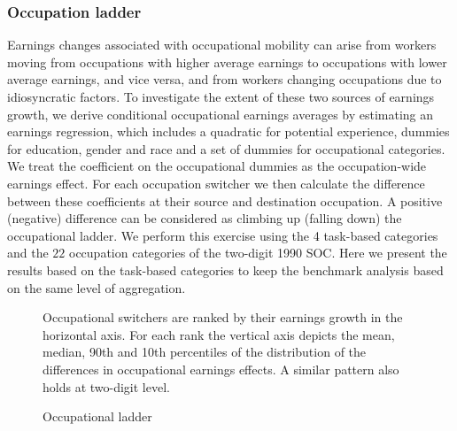 \documentclass[12pt]{article}
\theoremstyle{definition}
\begin{document}
\subsubsection{Occupation ladder}

Earnings changes associated with occupational mobility can arise from workers moving from occupations with higher average earnings to occupations with lower average earnings, and vice versa, and from workers changing occupations due to idiosyncratic factors. To investigate the extent of these two sources of earnings growth, we derive conditional occupational earnings averages by estimating an earnings regression, which includes a quadratic for potential experience, dummies for education, gender and race and a set of dummies for occupational categories. We treat the coefficient on the occupational dummies as the occupation-wide earnings effect. For each occupation switcher we then calculate the difference between these coefficients at their source and destination occupation. A positive (negative) difference can be considered as climbing up (falling down) the occupational ladder. We perform this exercise using the 4 task-based categories and the $22$ occupation categories of the two-digit 1990 SOC. Here we present the results based on the task-based categories to keep the benchmark analysis based on the same level of aggregation. 

\begin{figure}[H]
    \noindent\caption{Occupational ladder}
    \begin{center}
    \end{center}
    \vspace{-20pt}
    {\footnotesize Occupational switchers are ranked by their earnings growth in the horizontal axis. For each rank the vertical axis depicts the mean, median, 90th and 10th percentiles of the distribution of the differences in occupational earnings effects. A similar pattern also holds at two-digit level.}
    \label{carrillo-tudelaCyclicalEarningsCareer2022_fig3}
\end{figure}
\end{document}
